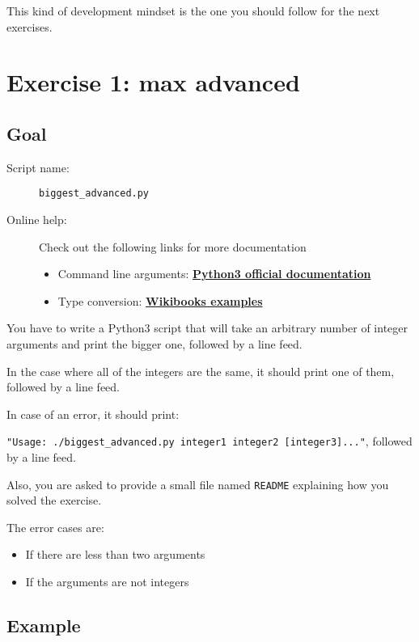 \documentclass[12pt]{article}
\let\oldhref\href
\renewcommand{\href}[2]{\oldhref{#1}{\bfseries#2}}
\begin{document}
This kind of development mindset is the one you should follow for the next exercises.

\section{Exercise 1: max advanced}

\subsection{Goal}

\begin{description}
        \item[Script name:] \texttt{biggest\_advanced.py}
        \item[Online help:] Check out the following links for more documentation
\begin{itemize}
	\item Command line arguments: \href{https://docs.python.org/3.0/library/sys.html\#sys.argv}{Python3 official documentation}
	\item Type conversion: \href{https://en.wikibooks.org/wiki/Python_Programming/Data_Types\#Type_conversion}{Wikibooks examples}
\end{itemize}
\end{description}
      	
You have to write a Python3 script that will take an arbitrary number of integer arguments and print the bigger one, followed by a line feed.

In the case where all of the integers are the same, it should print one of them, followed by a line feed.

In case of an error, it should print:

\texttt{"Usage: ./biggest\_advanced.py integer1 integer2 [integer3]..."}, followed by a line feed.

Also, you are asked to provide a small file named \texttt{README} explaining how you solved the exercise.

The error cases are:

\begin{itemize}
	\item If there are less than two arguments
	\item If the arguments are not integers
\end{itemize}

\subsection{Example}
\end{document}
